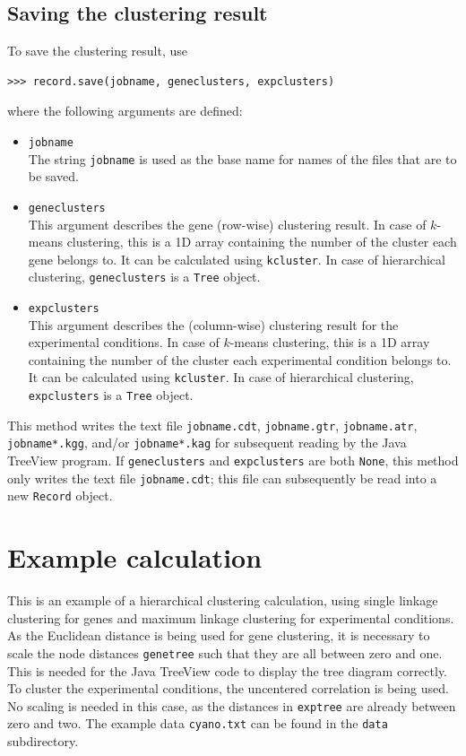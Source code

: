 \documentclass{report}
\begin{document}
\subsection*{Saving the clustering result}

To save the clustering result, use
\begin{verbatim}
>>> record.save(jobname, geneclusters, expclusters)
\end{verbatim}
where the following arguments are defined:
\begin{itemize}
\item \verb|jobname| \\
The string \verb|jobname| is used as the base name for names of the files that are to be saved.
\item \verb|geneclusters| \\
This argument describes the gene (row-wise) clustering result. In case of $k$-means clustering, this is a 1D array containing the number of the cluster each gene belongs to. It can be calculated using \verb|kcluster|. In case of hierarchical clustering, \verb|geneclusters| is a \verb|Tree| object.
\item \verb|expclusters| \\
This argument describes the (column-wise) clustering result for the experimental conditions. In case of $k$-means clustering, this is a 1D array containing the number of the cluster each experimental condition belongs to. It can be calculated using \verb|kcluster|. In case of hierarchical clustering, \verb|expclusters| is a \verb|Tree| object.
\end{itemize}

This method writes the text file \verb|jobname.cdt|, \verb|jobname.gtr|, \verb|jobname.atr|, \verb|jobname*.kgg|, and/or \verb|jobname*.kag| for subsequent reading by the Java TreeView program. If \verb|geneclusters| and \verb|expclusters| are both \verb|None|, this method only writes the text file \verb|jobname.cdt|; this file can subsequently be read into a new \verb|Record| object.
\section{Example calculation}

This is an example of a hierarchical clustering calculation, using single linkage clustering for genes and maximum linkage clustering for experimental conditions. As the Euclidean distance is being used for gene clustering, it is necessary to scale the node distances \verb|genetree| such that they are all between zero and one. This is needed for the Java TreeView code to display the tree diagram correctly. To cluster the experimental conditions, the uncentered correlation is being used. No scaling is needed in this case, as the distances in \verb|exptree| are already between zero and two. The example data \verb|cyano.txt| can be found in the \verb|data| subdirectory.
\end{document}
